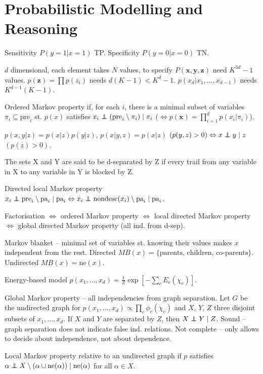 \documentclass[twocolumn]{article}
\newcommand\ind{\protect\mathpalette{\protect\independenT}{\perp}}
\def\independenT#1#2{\mathrel{\rlap{$#1#2$}\mkern2mu{#1#2}}}
\begin{document}
\section*{Probabilistic Modelling and Reasoning}

Sensitivity $P(y=1|x=1)$ TP. Specificity $P(y=0|x=0)$ TN.

$d$ dimensional, each element takes $N$ values, to specify $P(\mathbf{x},\mathbf{y},\mathbf{z})$ need $K^{3d}-1$ values. $p(\mathbf{z})=\prod p(z_i)$ needs $d(K-1)<K^{d}-1$. $p(x_d|x_1,...,x_{d-1})$ needs $K^{d-1}(K-1)$.

Ordered Markov property if, for each $i$, there is a minimal subset of variables $\pi_i\subseteq\text{pre}_i$ st. $p(x)$ satisfies $x_i \ind (\text{pre}_i\setminus\pi_i)\mid\pi_i$ ($\Leftrightarrow p(\mathbf{x})=\prod_{i=1}^d p(x_i|\pi_i)$).

$p(x,y|z)=p(x|z)p(y|z)$, $p(x|y,z)=p(x|z)$ $(p(y,z)>0) \Leftrightarrow x\ind y\mid z$ $(p(z)>0)$.

The sets X and Y are said to be d-separated by Z if every trail from any variable in X to any variable in Y is blocked by Z.

Directed local Markov property $x_i\ind\text{pre}_i\setminus\text{pa}_i\mid\text{pa}_i\Leftrightarrow x_i\ind \text{nondesc}(x_i)\setminus\text{pa}_i\mid\text{pa}_i$.

Factorisation $\Leftrightarrow$ ordered Markov property $\Leftrightarrow$ local directed Markov property $\Leftrightarrow$ global directed Markov property (all ind. from d-sep).

Markov blanket -- minimal set of variables st. knowing their values makes $x$ independent from the rest. Directed $MB(x)=\{\text{parents, children, co-parents}\}$. Undirected $MB(x)=\text{ne}(x)$.

Energy-based model $p(x_1,...,x_d)=\frac{1}{Z}\exp[-\sum_c E_c(\chi_c)]$.

Global Markov property -- all independencies from graph separation. Let $G$ be the undirected graph for $p(x_1,...,x_d)\propto\prod_c\phi_c(\chi_c)$ and $X$, $Y$, $Z$ three disjoint subsets of ${x_1,...,x_d}$. If $X$ and $Y$ are separated by $Z$, then $X\ind Y\mid Z$. Sound -- graph separation does not indicate false ind. relations. Not complete -- only allows to decide about independence, not about dependence.

Local Markov property relative to an undirected graph if $p$ satisfies $\alpha\ind X\setminus(\alpha\cup\text{ne}(\alpha))\mid \text{ne}(\alpha)$ for all $\alpha\in X$.
\end{document}
